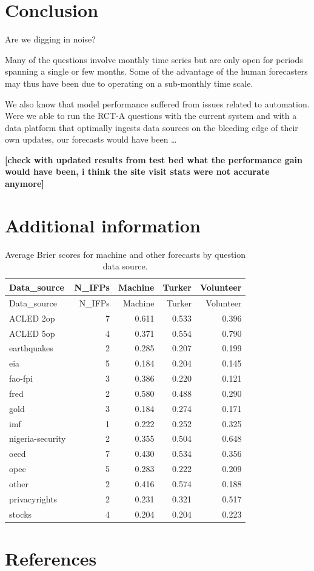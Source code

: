 \documentclass[]{article}
\begin{document}
\section{Conclusion}\label{conclusion}

Are we digging in noise?

Many of the questions involve monthly time series but are only open for
periods spanning a single or few months. Some of the advantage of the
human forecasters may thus have been due to operating on a sub-monthly
time scale.

We also know that model performance suffered from issues related to
automation. Were we able to run the RCT-A questions with the current
system and with a data platform that optimally ingests data sources on
the bleeding edge of their own updates, our forecasts would have been
\ldots{}

\textbf{{[}check with updated results from test bed what the performance
gain would have been, i think the site visit stats were not accurate
anymore{]}}

\section{Additional information}\label{additional-information}

\begin{longtable}[]{@{}lrrrr@{}}
\caption{Average Brier scores for machine and other forecasts by
question data source.}\tabularnewline
\toprule
Data\_source & N\_IFPs & Machine & Turker & Volunteer\tabularnewline
\midrule
\endfirsthead
\toprule
Data\_source & N\_IFPs & Machine & Turker & Volunteer\tabularnewline
\midrule
\endhead
ACLED 2op & 7 & 0.611 & 0.533 & 0.396\tabularnewline
ACLED 5op & 4 & 0.371 & 0.554 & 0.790\tabularnewline
earthquakes & 2 & 0.285 & 0.207 & 0.199\tabularnewline
eia & 5 & 0.184 & 0.204 & 0.145\tabularnewline
fao-fpi & 3 & 0.386 & 0.220 & 0.121\tabularnewline
fred & 2 & 0.580 & 0.488 & 0.290\tabularnewline
gold & 3 & 0.184 & 0.274 & 0.171\tabularnewline
imf & 1 & 0.222 & 0.252 & 0.325\tabularnewline
nigeria-security & 2 & 0.355 & 0.504 & 0.648\tabularnewline
oecd & 7 & 0.430 & 0.534 & 0.356\tabularnewline
opec & 5 & 0.283 & 0.222 & 0.209\tabularnewline
other & 2 & 0.416 & 0.574 & 0.188\tabularnewline
privacyrights & 2 & 0.231 & 0.321 & 0.517\tabularnewline
stocks & 4 & 0.204 & 0.204 & 0.223\tabularnewline
\bottomrule
\end{longtable}

\section*{References}\label{references}
\end{document}
